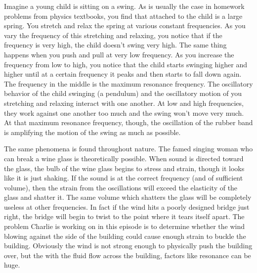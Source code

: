 Imagine a young child is sitting on a swing. As is usually the case in homework problems from physics textbooks, you find that attached to the child is a large spring. You stretch and relax the spring at various constant frequencies. As you vary the frequency of this stretching and relaxing, you notice that if the frequency is very high, the child doesn't swing very high. The same thing happens when you push and pull at very low frequency. As you increase the frequency from low to high, you notice that the child starts swinging higher and higher until at a certain frequency it peaks and then starts to fall down again.  The frequency in the middle is the maximum resonance frequency. The oscillatory behavior of the child swinging (a pendulum) and the oscillatory motion of you stretching and relaxing interact with one another. At low and high frequencies, they work against one another too much and the swing won't move very much. At that maximum resonance frequency, though, the oscillation of the rubber band is amplifying the motion of the swing as much as possible. 


The same phenomena is found throughout nature. The famed singing woman who can break a wine glass is theoretically possible. When sound is directed toward the glass, the bulb of the wine glass begins to stress and strain, though it looks like it is just shaking. If the sound is at the correct frequency (and of sufficient volume), then the strain from the oscillations will exceed the elasticity of the glass and shatter it. The same volume which shatters the glass will be completely useless at other frequencies.  In fact if the wind hits a poorly designed bridge just right, the bridge will begin to twist to the point where it tears itself apart. The problem Charlie is working on in this episode is to determine whether the wind blowing against the side of the building could cause enough strain to buckle the building. Obviously the wind is not strong enough to physically push the building over, but the with the fluid flow across the building, factors like resonance can be huge.


